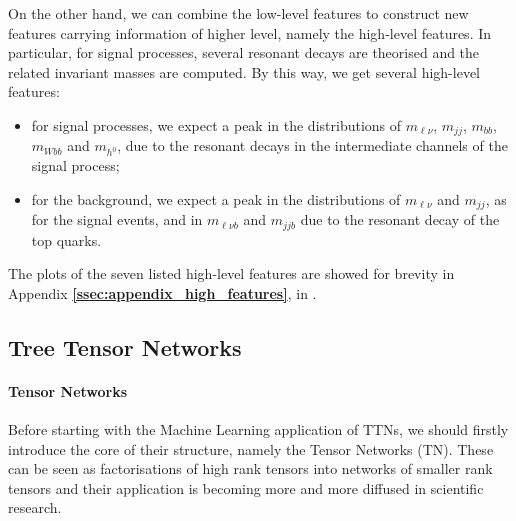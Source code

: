 \documentclass[../main/main.tex]{subfiles}
\begin{document}
On the other hand, we can combine the low-level features to construct new features carrying information of higher level, namely the high-level features. In particular, for signal processes, several resonant decays are theorised and the related invariant masses are computed. By this way, we get several high-level features:
\begin{itemize}
    \item for signal processes, we expect a peak in the distributions of \( m_{\ell\nu} \), \( m_{jj} \), \( m_{bb} \), \( m_{Wbb} \) and \( m_{h^{0}} \), due to the resonant decays in the intermediate channels of the signal process;
    \item for the background, we expect a peak in the distributions of \( m_{\ell\nu} \) and \( m_{jj} \), as for the signal events, and in \( m_{\ell\nu b} \) and \( m_{jjb} \) due to the resonant decay of the top quarks.
\end{itemize}
The plots of the seven listed high-level features are showed for brevity in Appendix \textbf{\ref{ssec:appendix_high_features}}, in .



\subsection{Tree Tensor Networks}
\label{ssec:theory_TTN}

\paragraph{Tensor Networks}
Before starting with the Machine Learning application of TTNs, we should firstly introduce the core of their structure, namely the Tensor Networks (TN). These can be seen as factorisations of high rank tensors into networks of smaller rank tensors and their application is becoming more and more diffused in scientific research.
\end{document}
